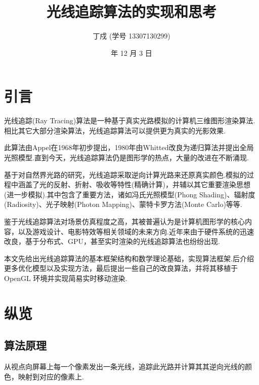 \documentclass[10pt,twocolumn]{article}
\begin{document}
\title{\hei 光线追踪算法的实现和思考}
\author{\fs 丁戍 \small{\fs (学号 13307130299)}}
\date{\small {} 年 12 月 3 日}

\section{\hei 引言}
光线追踪(Ray Tracing)算法是一种基于真实光路模拟的计算机三维图形渲染算法.相比其它大部分渲染算法，光线追踪算法可以提供更为真实的光影效果.

此算法由Appel在1968年初步提出，1980年由Whitted改良为递归算法并提出全局光照模型.直到今天，光线追踪算法仍是图形学的热点，大量的改进在不断涌现.

基于对自然界光路的研究，光线追踪采取逆向计算光路来还原真实颜色.模拟的过程中涵盖了光的反射、折射、吸收等特性(精确计算)，并辅以其它重要渲染思想(进一步模拟).其中包含了重要方法，诸如冯氏光照模型(Phong Shading)、辐射度(Radiosity)、光子映射(Photon Mapping)、蒙特卡罗方法(Monte Carlo)等等.

鉴于光线追踪算法对场景仿真程度之高，其被普遍认为是计算机图形学的核心内容，以及游戏设计、电影特效等相关领域的未来方向.近年来由于硬件系统的迅速改良，基于分布式、GPU，甚至实时渲染的光线追踪算法也纷纷出现.

本文先给出光线追踪算法的基本框架结构和数学理论基础，实现算法框架.后介绍更多优化模型以及实现方法，最后提出一些自己的改良算法，并将其移植于 OpenGL 环境并实现简易实时移动渲染.

\section{\hei 纵览}
\subsection{\hei 算法原理}
从视点向屏幕上每一个像素发出一条光线，追踪此光路并计算其其逆向光线的颜色，映射到对应的像素上.
\end{document}
